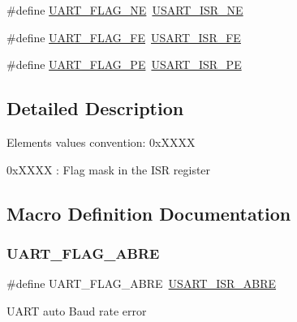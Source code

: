 \begin{DoxyCompactItemize}
\item 
\#define \mbox{\hyperlink{group___u_a_r_t___flags_ga665981434d02ff5296361782c1a7d4b5}{U\+A\+R\+T\+\_\+\+F\+L\+A\+G\+\_\+\+NE}}~\mbox{\hyperlink{group___peripheral___registers___bits___definition_ga09c7d19477a091689f50bd0ef5b6a3d8}{U\+S\+A\+R\+T\+\_\+\+I\+S\+R\+\_\+\+NE}}
\item 
\#define \mbox{\hyperlink{group___u_a_r_t___flags_gafba4891ce21cf5223ca5fede0eac388d}{U\+A\+R\+T\+\_\+\+F\+L\+A\+G\+\_\+\+FE}}~\mbox{\hyperlink{group___peripheral___registers___bits___definition_ga27cc4dfb6d5e817a69c80471b87deb4b}{U\+S\+A\+R\+T\+\_\+\+I\+S\+R\+\_\+\+FE}}
\item 
\#define \mbox{\hyperlink{group___u_a_r_t___flags_gad5b96f73f6d3a0b58f07e2e9d7bf14d9}{U\+A\+R\+T\+\_\+\+F\+L\+A\+G\+\_\+\+PE}}~\mbox{\hyperlink{group___peripheral___registers___bits___definition_gaa10e69d231b67d698ab59db3d338baa6}{U\+S\+A\+R\+T\+\_\+\+I\+S\+R\+\_\+\+PE}}
\end{DoxyCompactItemize}


\subsection{Detailed Description}
Elements values convention\+: 0x\+X\+X\+XX
\begin{DoxyItemize}
\item 0x\+X\+X\+XX \+: Flag mask in the I\+SR register 
\end{DoxyItemize}

\subsection{Macro Definition Documentation}
\mbox{\label{group___u_a_r_t___flags_ga87853efaab808377c8acb9e8b671a2e8}} 
\subsubsection{\texorpdfstring{UART\_FLAG\_ABRE}{UART\_FLAG\_ABRE}}
{\footnotesize\ttfamily \#define U\+A\+R\+T\+\_\+\+F\+L\+A\+G\+\_\+\+A\+B\+RE~\mbox{\hyperlink{group___peripheral___registers___bits___definition_gae762a0bed3b7ecde26377eccd40d1e10}{U\+S\+A\+R\+T\+\_\+\+I\+S\+R\+\_\+\+A\+B\+RE}}}

U\+A\+RT auto Baud rate error \mbox{\label{group___u_a_r_t___flags_ga9e309874f2c8f71e4049ae6cb702a2eb}} 
